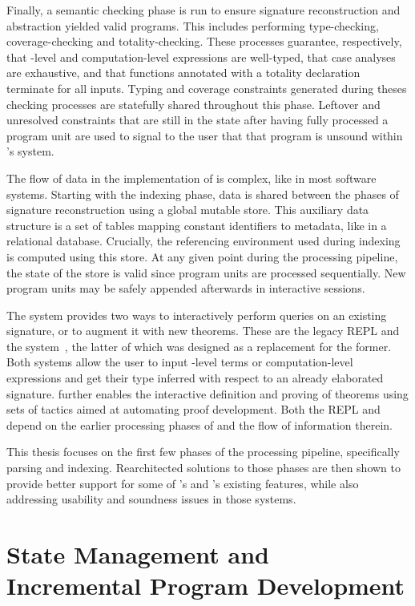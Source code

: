 Finally, a semantic checking phase is run to ensure signature reconstruction and abstraction yielded valid programs.
This includes performing type-checking, coverage-checking and totality-checking.
These processes guarantee, respectively, that \LF-level and computation-level expressions are well-typed, that case analyses are exhaustive, and that functions annotated with a totality declaration terminate for all inputs.
Typing and coverage constraints generated during theses checking processes are statefully shared throughout this phase.
Leftover and unresolved constraints that are still in the state after having fully processed a program unit are used to signal to the user that that program is unsound within \Beluga's system.

The flow of data in the implementation of \Beluga is complex, like in most software systems.
Starting with the indexing phase, data is shared between the phases of signature reconstruction using a global mutable store.
This auxiliary data structure is a set of tables mapping constant identifiers to metadata, like in a relational database.
Crucially, the referencing environment used during indexing is computed using this store.
At any given point during the processing pipeline, the state of the store is valid since program units are processed sequentially.
New program units may be safely appended afterwards in interactive sessions.

The \Beluga system provides two ways to interactively perform queries on an existing \Beluga signature, or to augment it with new theorems.
These are the legacy \ac{REPL} and the \Harpoon system~\cite{errington2021harpoon}, the latter of which was designed as a replacement for the former.
Both systems allow the user to input \LF-level terms or computation-level expressions and get their type inferred with respect to an already elaborated \Beluga signature.
\Harpoon further enables the interactive definition and proving of theorems using sets of tactics aimed at automating proof development.
Both the \ac{REPL} and \Harpoon depend on the earlier processing phases of \Beluga and the flow of information therein.

This thesis focuses on the first few phases of the \Beluga processing pipeline, specifically parsing and indexing.
Rearchitected solutions to those phases are then shown to provide better support for some of \Beluga's and \Harpoon's existing features, while also addressing usability and soundness issues in those systems.

\section{State Management and Incremental Program Development}\label{section:intro-state-management}

